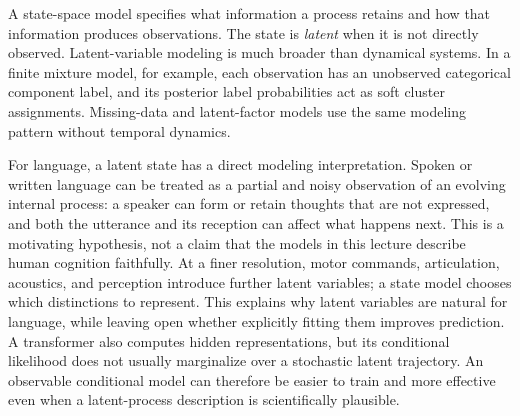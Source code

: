 \documentclass[11pt,twoside]{article}
\theoremstyle{definition}
\theoremstyle{remark}
\begin{document}
A state-space model specifies what information a process retains and how
that information produces observations. The state is \emph{latent} when it is not
directly observed. Latent-variable modeling is much broader than dynamical
systems. In a finite mixture model, for example, each observation has an
unobserved categorical component label, and its posterior label probabilities
act as soft cluster assignments. Missing-data and latent-factor models use
the same modeling pattern without temporal dynamics.

For language, a latent state has a direct modeling interpretation.
Spoken or written language can be treated as a partial and noisy observation
of an evolving internal process: a speaker can form or retain thoughts that
are not expressed, and both the utterance and its reception can affect what
happens next. This is a motivating hypothesis, not a claim that the models in
this lecture describe human cognition faithfully. At a finer resolution,
motor commands, articulation, acoustics, and perception introduce further
latent variables; a state model chooses which distinctions to represent.
This explains why latent variables are natural for language, while leaving
open whether explicitly fitting them improves prediction. A transformer also
computes hidden representations, but its conditional likelihood does not
usually marginalize over a stochastic latent trajectory. An observable
conditional model can therefore be easier to train and more effective even
when a latent-process description is scientifically plausible.
\end{document}
